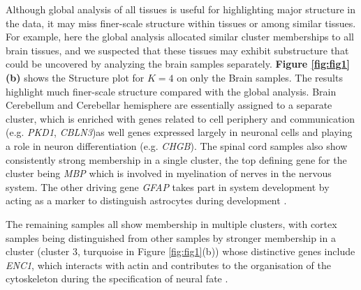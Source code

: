 Although global analysis of all tissues is useful for highlighting major structure in the data, it may miss finer-scale structure within tissues or among similar tissues. For example, here the global analysis allocated similar cluster memberships to all brain tissues,  and we suspected that these tissues may exhibit substructure that could be uncovered by analyzing the brain samples separately.  \textbf{Figure \ref{fig:fig1}(b)} shows the Structure plot for $K=4$ on only the Brain samples. The results highlight much finer-scale structure compared with the global analysis. Brain Cerebellum and Cerebellar hemisphere are essentially assigned to a separate cluster, which is enriched with genes related to cell periphery and communication (e.g. \textit{PKD1}, \textit{CBLN3})as well genes expressed largely in neuronal cells and playing a role in neuron differentiation (e.g. \textit{CHGB}). The spinal cord samples also show consistently strong membership in a single cluster, the top defining gene for the cluster being \textit{MBP} which is involved in myelination of nerves in the nervous system\cite{Hu2016}.  The other driving gene \textit{GFAP} takes part in system development by acting as a marker to distinguish astrocytes during development \cite{Baba1997}. 



The remaining samples all show membership in multiple clusters, with cortex samples being distinguished from other samples by stronger membership in a cluster (cluster 3, turquoise in Figure \ref{fig:fig1}(b)) whose distinctive genes include \textit{ENC1}, which  interacts with actin and contributes to the organisation of the cytoskeleton during the specification of neural fate \cite{Hernandez1997}.



